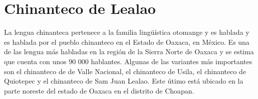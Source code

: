 \section*{Chinanteco de Lealao}

\noindent La lengua chinanteca pertenece a la familia lingüística otomange y es hablada y es hablada por el pueblo chinanteco en el Estado de Oaxaca, en México. Es una de las lengua más habladas en la región de la Sierra Norte de Oaxaca y se estima que cuenta con unos 90 000 hablantes. Algunas de las variantes más importantes son el chinanteco de de Valle Nacional, el chinanteco de Usila, el chinanteco de Quiotepec y el chinanteco de Sam Juan Lealao. Este útimo está ubicado en la parte noreste del estado de Oaxaca en el distrito de Choapan. \vspace{1cm}

